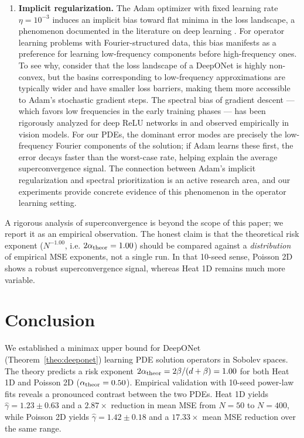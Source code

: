 \documentclass[12pt,a4paper]{article}
\begin{document}
\begin{enumerate}
    \item \textbf{Implicit regularization.}
        The Adam optimizer with fixed learning rate $\eta = 10^{-3}$ induces an
        implicit bias toward flat minima in the loss landscape, a phenomenon
        documented in the literature on deep learning \citep{keskar2017implicit}.
        For operator learning problems with Fourier-structured data, this bias
        manifests as a preference for learning low-frequency components before
        high-frequency ones.  To see why, consider that the loss landscape of a
        DeepONet is highly non-convex, but the basins corresponding to low-frequency
        approximations are typically wider and have smaller loss barriers, making
        them more accessible to Adam's stochastic gradient steps.  The spectral
        bias of gradient descent — which favors low frequencies in the early
        training phases — has been rigorously analyzed for deep ReLU networks
        in \citet{yarotsky2017neural,petersen2018optimal} and observed empirically
        in vision models.  For our PDEs, the dominant error modes are precisely
        the low-frequency Fourier components of the solution; if Adam learns these
        first, the error decays faster than the worst-case rate, helping explain
        the average superconvergence signal.  The connection between Adam's
        implicit regularization and spectral prioritization is an active research
        area, and our experiments provide concrete evidence of this phenomenon in
        the operator learning setting.
\end{enumerate}

A rigorous analysis of superconvergence is beyond the scope of this paper;
we report it as an empirical observation.  The honest claim is that the
theoretical risk exponent ($N^{-1.00}$, i.e. $2\alpha_{\rm theor}=1.00$) should
be compared against a \emph{distribution} of empirical MSE exponents, not a
single run.  In that 10-seed sense, Poisson 2D shows a robust superconvergence
signal, whereas Heat 1D remains much more variable.

\section{Conclusion}
\label{sec:conclusion}

We established a minimax upper bound for DeepONet (Theorem~\ref{theo:deeponet})
learning PDE solution operators in Sobolev spaces.  The theory predicts a risk
exponent $2\alpha_{\rm theor} = 2\beta/(d+\beta) = 1.00$ for both Heat 1D and
Poisson 2D ($\alpha_{\rm theor}=0.50$).
Empirical validation with 10-seed power-law fits reveals a pronounced contrast
between the two PDEs.  Heat 1D yields $\hat\gamma=1.23 \pm 0.63$ and a
$2.87\times$ reduction in mean MSE from $N=50$ to $N=400$, while Poisson 2D
yields $\hat\gamma=1.42 \pm 0.18$ and a $17.33\times$ mean MSE reduction over
the same range.
\end{document}
